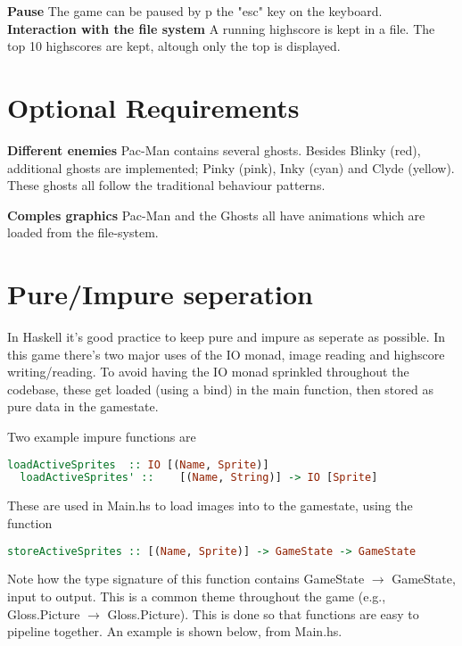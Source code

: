 \documentclass[11pt]{Article}
\begin{document}
\noindent \textbf{Pause} The game can be paused by p the "esc" key on the keyboard.\\

\noindent \textbf{Interaction with the file system} A running highscore is kept in a file. The top 10 highscores are kept, altough only the top is displayed.\\


\newpage
\section{Optional Requirements} \label{ch:optionalRequirements}

\textbf{Different enemies} Pac-Man contains several ghosts. Besides Blinky (red), additional ghosts are implemented; Pinky (pink), Inky (cyan) and Clyde (yellow). These ghosts all follow the traditional behaviour patterns. 

\textbf{Comples graphics} Pac-Man and the Ghosts all have animations which are loaded from the file-system.


\section{Pure/Impure seperation} \label{ch:pureSeperation}
In Haskell it's good practice to keep pure and impure as seperate as possible. In this game there's two major uses of the IO monad, image reading and highscore writing/reading. To avoid having the IO monad sprinkled throughout the codebase, these get loaded (using a bind) in the main function, then stored as pure data in the gamestate. 

Two example impure functions are

\begin{lstlisting}[language=Haskell]
  loadActiveSprites  :: IO [(Name, Sprite)]
  loadActiveSprites' ::    [(Name, String)] -> IO [Sprite]
\end{lstlisting}

These are used in Main.hs to load images into to the gamestate, using the function 

\begin{lstlisting}[language=Haskell]
  storeActiveSprites :: [(Name, Sprite)] -> GameState -> GameState
\end{lstlisting}

Note how the type signature of this function contains GameState $\rightarrow$ GameState, input to output. This is a common theme throughout the game (e.g., Gloss.Picture $\rightarrow$ Gloss.Picture). This is done so that functions are easy to pipeline together. An example is shown below, from Main.hs.
\end{document}
